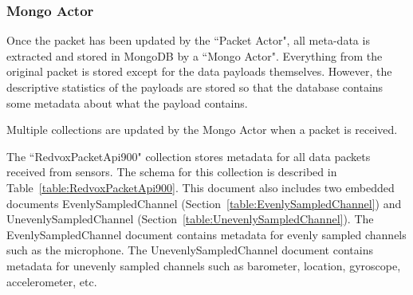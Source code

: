 \subsubsection{Mongo Actor}
Once the packet has been updated by the ``Packet Actor", all meta-data is extracted and stored in MongoDB by a ``Mongo Actor". Everything from the original packet is stored except for the data payloads themselves. However, the descriptive statistics of the payloads are stored so that the database contains some metadata about what the payload contains.

Multiple collections are updated by the Mongo Actor when a packet is received.

The ``RedvoxPacketApi900" collection stores metadata for all data packets received from sensors. The schema for this collection is described in Table~\ref{table:RedvoxPacketApi900}. This document also includes two embedded documents EvenlySampledChannel (Section~\ref{table:EvenlySampledChannel}) and UnevenlySampledChannel (Section~\ref{table:UnevenlySampledChannel}). The EvenlySampledChannel document contains metadata for evenly sampled channels such as the microphone. The UnevenlySampledChannel document contains metadata for unevenly sampled channels such as barometer, location, gyroscope, accelerometer, etc.

